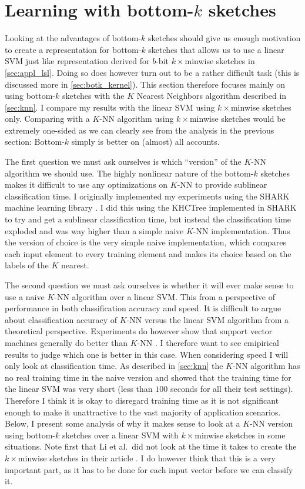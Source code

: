 \section{Learning with bottom-$k$ sketches}
Looking at the advantages of bottom-$k$ sketches should give us enough
motivation to create a representation for bottom-$k$ sketches that allows us
to use a linear SVM just like representation derived for $b$-bit
$k\times$minwise sketches in \autoref{sec:appl_lsl}. Doing so does
however turn out to be a rather difficult task (this is discussed more in
\autoref{sec:botk_kernel}). This section therefore focuses mainly on using
bottom-$k$ sketches with the $K$ Nearest Neighbors algorithm described in
\autoref{sec:knn}. I compare my results with the linear SVM using
$k\times$minwise sketches only. Comparing with a $K$-NN algorithm using
$k\times$minwise sketches would be extremely one-sided as we can clearly see
from the analysis in the previous section: Bottom-$k$ simply is better on
(almost) all accounts.

The first question we must ask ourselves is which ``version'' of the $K$-NN
algorithm we should use. The highly nonlinear nature of the bottom-$k$
sketches makes it difficult to use any optimizations on $K$-NN to provide
sublinear classification time. I originally implemented my experiments using
the SHARK machine learning library \cite{Igel08}. I did this using the KHCTree
implemented in SHARK to try and get a sublinear classification time, but
instead the classification time exploded and was way higher than a simple
naive $K$-NN implementation. Thus the version of choice is the very simple
naive implementation, which compares each input element to every training
element and makes its choice based on the labels of the $K$ nearest.

The second question we must ask ourselves is whether it will ever make sense
to use a naive $K$-NN algorithm over a linear SVM. This from a perspective
of performance in both classification accuracy and speed. It is difficult to
argue about classification accuracy of $K$-NN versus the linear SVM algorithm
from a theoretical perspective. Experiments do however show that support vector
machines generally do better than $K$-NN \cite{Meyer03}. I therefore want
to see emipirical results to judge which one is better in this case. When
considering speed I will only look at classification time. As described in
\autoref{sec:knn} the $K$-NN algorithm has no real training time in the naive
version and \cite{Li11} showed that the training time for the linear SVM was
very short (less than $100$ seconds for all their test settings). Therefore I
think it is okay to disregard training time as it is not significant enough
to make it unattractive to the vast majority of application scenarios. Below,
I present some analysis of why it makes sense to look at a $K$-NN version
using bottom-$k$ sketches over a linear SVM with $k\times$minwise sketches in
some situations. Note first that Li et al.~did not look at the time it takes
to create the $k\times$minwise sketches in their article \cite{Li11}. I do
however think that this is a very important part, as it has to be done for
each input vector before we can classify it.

